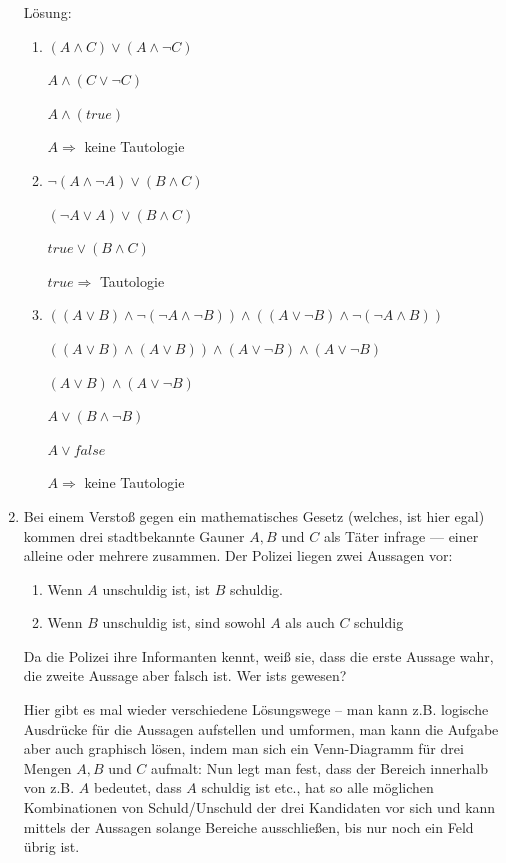 \documentclass[../main.tex]{subfiles}
\begin{document}
\begin{enumerate}
	      Lösung:
	      \begin{enumerate}
		      \item \( (A \land C) \lor (A \land \neg C) \)

		            \( A \land (C \lor \neg C ) \)

		            \( A \land (true) \)

		            \( A  \Rightarrow \)  keine Tautologie
		      \item \( \neg (A \land \neg A) \lor (B \land C) \)

		            \( (\neg A \lor A )  \lor ( B \land C ) \)


		            \( true \lor ( B \land C ) \)

		            \( true \Rightarrow \) Tautologie
		      \item \( ((A \lor B) \land \neg (\neg A \land \neg B)) \land
		            ((A \lor \neg B) \land \neg (\neg A \land B)) \)

		            \( ((A \lor B) \land (A \lor B)) \land
		            (A \lor \neg B) \land (A \lor \neg B) \)

		            \( (A \lor B) \land (A \lor \neg B) \)

		            \( A \lor (B \land \neg B) \)

		            \( A \lor false \)

		            \( A \Rightarrow \) keine Tautologie
	      \end{enumerate}
	\item Bei einem Verstoß gegen ein mathematisches Gesetz (welches, ist hier egal)
	      kommen drei stadtbekannte Gauner \( A, B \) und \( C \) als Täter infrage — einer alleine oder mehrere zusammen.
	      Der Polizei liegen zwei Aussagen vor:
	      \begin{enumerate}
		      \item Wenn \( A \) unschuldig ist, ist \( B \) schuldig.
		      \item Wenn \( B \) unschuldig ist, sind sowohl \( A \) als auch \( C \) schuldig
	      \end{enumerate}
	      Da die Polizei ihre Informanten kennt, weiß sie, dass die erste Aussage wahr,
	      die zweite Aussage aber falsch ist. Wer ists gewesen?

	      Hier gibt es mal wieder verschiedene Lösungswege – man kann z.B. logische Ausdrücke
	      für die Aussagen aufstellen und umformen, man kann die Aufgabe aber auch graphisch lösen,
	      indem man sich ein Venn-Diagramm für drei Mengen \( A, B \) und \( C \) aufmalt:
	      Nun legt man fest, dass der Bereich innerhalb von z.B. \( A \) bedeutet, dass \( A \)
	      schuldig ist etc., hat so alle möglichen Kombinationen von Schuld/Unschuld
	      der drei Kandidaten vor sich und kann mittels der Aussagen solange Bereiche ausschließen,
	      bis nur noch ein Feld übrig ist.


\end{enumerate}
\end{document}
